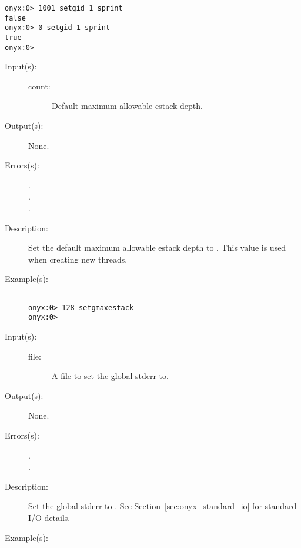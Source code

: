 \begin{description}
\begin{description}
\begin{verbatim}
onyx:0> 1001 setgid 1 sprint
false
onyx:0> 0 setgid 1 sprint
true
onyx:0>
		\end{verbatim}
	\end{description}
\label{systemdict:setgmaxestack}
\item[{\onyxop{count}{setgmaxestack}{--}}: ]
	\begin{description}\item[]
	\item[Input(s): ]
		\begin{description}\item[]
		\item[count: ]
			Default maximum allowable estack depth.
		\end{description}
	\item[Output(s): ] None.
	\item[Errors(s): ]
		\begin{description}\item[]
		\item[.]
		\item[.]
		\item[.]
		\end{description}
	\item[Description: ]
		Set the default maximum allowable estack depth to .
		This value is used when creating new threads.
	\item[Example(s): ]\begin{verbatim}

onyx:0> 128 setgmaxestack
onyx:0>
		\end{verbatim}
	\end{description}
\label{systemdict:setgstderr}
\item[{\onyxop{file}{setgstderr}{--}}: ]
	\begin{description}\item[]
	\item[Input(s): ]
		\begin{description}\item[]
		\item[file: ]
			A file to set the global stderr to.
		\end{description}
	\item[Output(s): ] None.
	\item[Errors(s): ]
		\begin{description}\item[]
		\item[.]
		\item[.]
		\end{description}
	\item[Description: ]
		Set the global stderr to .  See
		Section~\ref{sec:onyx_standard_io} for standard I/O details.
	\item[Example(s): ]\begin{verbatim}


\end{verbatim}
\end{description}
\end{description}
